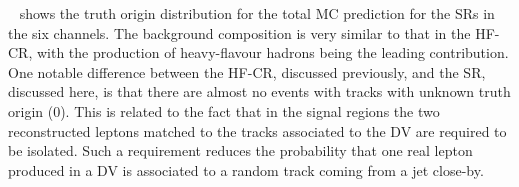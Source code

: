 ~ shows the truth origin distribution for the total MC prediction for the SRs in the six channels. The background composition is very similar to that in the \uuu HF-CR, with the production of heavy-flavour hadrons being the leading contribution. One notable difference between the \uuu HF-CR, discussed previously, and the SR, discussed here, is that there are almost no events with tracks with unknown truth origin (0). This is related to the fact that in the signal regions the two reconstructed leptons matched to the tracks associated to the DV are required to be isolated. Such a requirement reduces the probability that one real lepton produced in a DV is associated to a random track coming from a jet close-by.

\begin{figure}[!ht]
    \centering
    \\

\end{figure}
